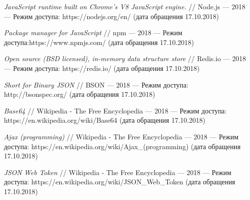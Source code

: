 \documentclass[14pt]{extarticle}
\begin{document}
\begin{thebibliography}{9}
\textit{JavaScript runtime built on Chrome's V8 JavaScript engine.} //
Node.js --- 2018  --- Режим доступа: https://nodejs.org/en/ (дата обращения 17.10.2018)

\textit{Package manager for JavaScript} //
npm ---  2018  --- Режим доступа:https://www.npmjs.com/ (дата обращения 17.10.2018)

\textit{Open source (BSD licensed), in-memory data structure store} //
Redis.io --- 2018 --- Режим доступа: https://redis.io/ (дата обращения 17.10.2018)

\textit{Short for Bin­ary JSON} //
BSON --- 2018 --- Режим доступа: http://bsonspec.org/ (дата обращения 17.10.2018)

\textit{Base64} //
Wikipedia - The Free Encyclopedia --- 2018 --- Режим доступа: https://en.wikipedia.org/wiki/Base64 (дата обращения 17.10.2018)

\textit{Ajax (programming)} //
Wikipedia - The Free Encyclopedia --- 2018 --- Режим доступа: https://en.wikipedia.org/wiki/Ajax\_(programming) (дата обращения 17.10.2018)

\textit{JSON Web Token} //
Wikipedia - The Free Encyclopedia --- 2018 --- Режим доступа: https://en.wikipedia.org/wiki/JSON\_Web\_Token (дата обращения 17.10.2018)

\end{thebibliography}
\end{document}
